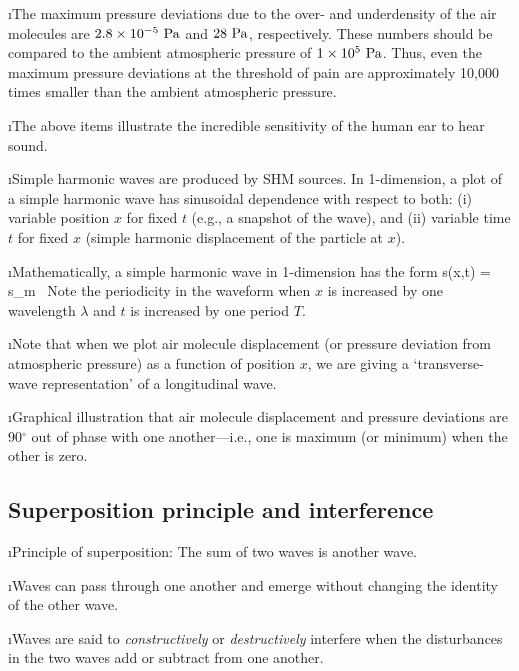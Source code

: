 \i The maximum pressure deviations due to the over- and 
underdensity of the air molecules are
$2.8\times 10^{-5}~{\rm Pa}$ and $28~{\rm Pa}$, respectively.
These numbers should be compared to the ambient atmospheric
pressure of $1\times 10^5~{\rm Pa}$.
Thus, even the maximum pressure deviations at the threshold 
of pain are approximately
10,000 times smaller than the ambient atmospheric pressure.

\i The above items illustrate the incredible sensitivity 
of the human ear to hear sound.

\i Simple harmonic waves are produced by SHM sources.
In 1-dimension, a plot of a simple harmonic wave has
sinusoidal dependence with respect to both:
(i) variable position $x$ for fixed $t$ (e.g., a snapshot of the wave), 
and
(ii) variable time $t$ for fixed $x$ (simple harmonic displacement of 
the particle at $x$).

\i Mathematically, a simple harmonic wave in 1-dimension
has the form
%
\be
s(x,t) = s_m \,\sin
{}
\ee
%
Note the periodicity in the waveform when $x$ is 
increased by one wavelength 
$\lambda$ and $t$ is increased by one period $T$.

\i Note that when we plot air molecule displacement 
(or pressure deviation from atmospheric pressure) 
as a function of position $x$, we are giving
a `transverse-wave representation' of a longitudinal
wave.

\i \demo Graphical illustration that air molecule displacement
and pressure deviations are 90$^\circ$ out of phase with 
one another---i.e., one is maximum (or minimum) 
when the other is zero.

\ei

\subsection{Superposition principle and interference}

\bi

\i Principle of superposition:
The sum of two waves is another wave.

\i Waves can pass through one another and emerge without
changing the identity of the other wave.

\i Waves are said to {\em constructively} or {\em destructively} 
interfere when the disturbances in the two waves add or subtract 
from one another.

